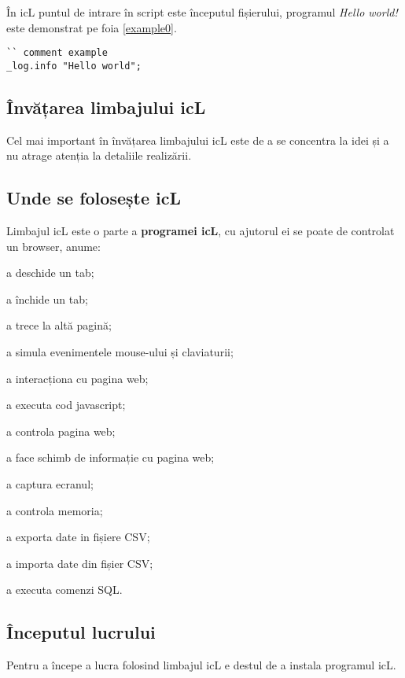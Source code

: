 În icL puntul de intrare în script este începutul fișierului, programul \textit{Hello world!} este demonstrat pe foia \ref{example0}.

\begin{lstlisting}[caption=Пример, label=example0]
`` comment example
_log.info "Hello world";
\end{lstlisting}

\subsection{Învățarea limbajului icL}

Cel mai important în învățarea limbajului icL este de a se concentra la idei și a nu atrage atenția la detaliile realizării.

\subsection{Unde se folosește icL}

Limbajul icL este o parte a \textbf{programei icL}, cu ajutorul ei se poate de controlat un browser, anume:
\begin{icItems}
\item
	a deschide un tab;
\item
	a închide un tab;
\item
	a trece la altă pagină;
\item
	a simula evenimentele mouse-ului și claviaturii;
\item
	a interacționa cu pagina web;
\item
	a executa cod javascript;
\item
	a controla pagina web;
\item
	a face schimb de informație cu pagina web;
\item
	a captura ecranul;
\item
	a controla memoria;
\item
	a exporta date in fișiere CSV;
\item
	a importa date din fișier CSV;
\item
	a executa comenzi SQL.
\end{icItems}

\subsection{Începutul lucrului}

Pentru a începe a lucra folosind limbajul icL e destul de a instala programul icL.
